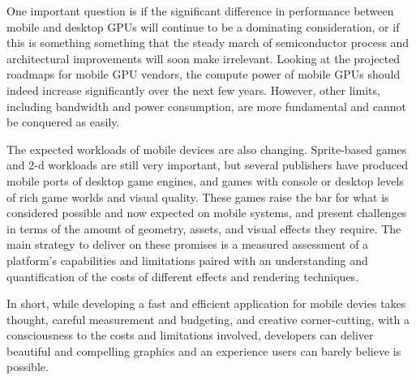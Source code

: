 One important question is if the significant difference in performance between
mobile and desktop GPUs will continue to be a dominating consideration, or if
this is something something that the steady march of semiconductor process and
architectural improvements will soon make irrelevant.  Looking at the projected
roadmaps for mobile GPU vendors, the compute power of mobile GPUs should indeed
increase significantly over the next few years.  However, other limits,
including bandwidth and power consumption, are more fundamental and cannot be
conquered as easily.

The expected workloads of mobile devices are also changing.  Sprite-based games
and 2-d workloads are still very important, but several publishers have
produced mobile ports of desktop game engines, and games with console or
desktop levels of rich game worlds and visual quality.  These games raise the
bar for what is considered possible and now expected on mobile systems, and
present challenges in terms of the amount of geometry, assets, and visual
effects they require.  The main strategy to deliver on these promises is a
measured assessment of a platform's capabilities and limitations paired with an
understanding and quantification of the costs of different effects and
rendering techniques.  

In short, while developing a fast and efficient application for mobile devies
takes thought, careful measurement and budgeting, and creative corner-cutting,
with a consciousness to the costs and limitations involved, developers can
deliver beautiful and compelling graphics and an experience users can barely
believe is possible.

 











